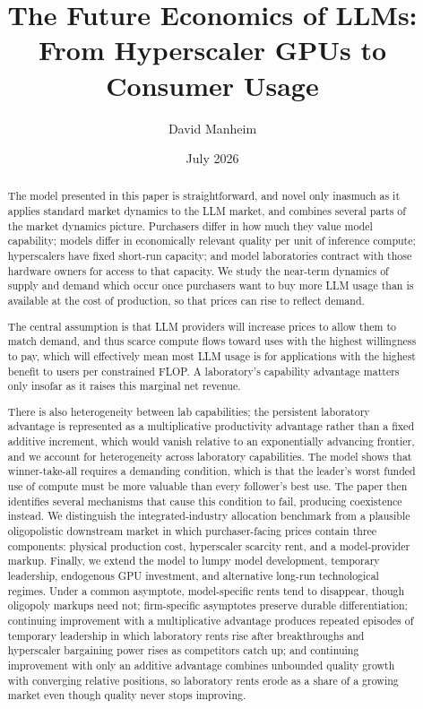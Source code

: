 \documentclass[11pt]{article}
\title{The Future Economics of LLMs: From Hyperscaler GPUs to Consumer Usage}
\author{David Manheim}
\date{July 2026}
\begin{document}
\maketitle

\begin{abstract}
The model presented in this paper is straightforward, and novel only inasmuch as it applies standard market dynamics to the LLM market, and combines several parts of the market dynamics picture. Purchasers differ in how much they value model capability; models differ in economically relevant quality per unit of inference compute; hyperscalers have fixed short-run capacity; and model laboratories contract with those hardware owners for access to that capacity. We study the near-term dynamics of supply and demand which occur once purchasers want to buy more LLM usage than is available at the cost of production, so that prices can rise to reflect demand.

The central assumption is that LLM providers will increase prices to allow them to match demand, and thus scarce compute flows toward uses with the highest willingness to pay, which will effectively mean most LLM usage is for applications with the highest benefit to users per constrained FLOP. A laboratory's capability advantage matters only insofar as it raises this marginal net revenue.

There is also heterogeneity between lab capabilities; the persistent laboratory advantage is represented as a multiplicative productivity advantage rather than a fixed additive increment, which would vanish relative to an exponentially advancing frontier, and we account for heterogeneity across laboratory capabilities. The model shows that winner-take-all requires a demanding condition, which is that the leader's worst funded use of compute must be more valuable than every follower's best use. The paper then identifies several mechanisms that cause this condition to fail, producing coexistence instead. We distinguish the integrated-industry allocation benchmark from a plausible oligopolistic downstream market in which purchaser-facing prices contain three components: physical production cost, hyperscaler scarcity rent, and a model-provider markup. Finally, we extend the model to lumpy model development, temporary leadership, endogenous GPU investment, and alternative long-run technological regimes. Under a common asymptote, model-specific rents tend to disappear, though oligopoly markups need not; firm-specific asymptotes preserve durable differentiation; continuing improvement with a multiplicative advantage produces repeated episodes of temporary leadership in which laboratory rents rise after breakthroughs and hyperscaler bargaining power rises as competitors catch up; and continuing improvement with only an additive advantage combines unbounded quality growth with converging relative positions, so laboratory rents erode as a share of a growing market even though quality never stops improving.
\end{abstract}
\end{document}
